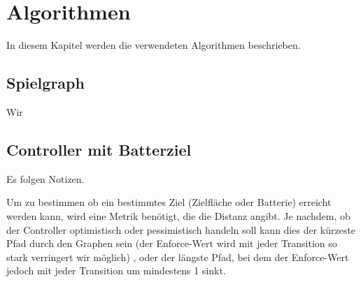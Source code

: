 \section{Algorithmen}
In diesem Kapitel werden die verwendeten Algorithmen beschrieben.
\subsection{Spielgraph}
Wir%

\subsection{Controller mit Batterziel}
Es folgen Notizen.

Um zu bestimmen ob ein bestimmtes Ziel (Zielfläche oder Batterie) erreicht werden kann, wird eine Metrik benötigt,
die die Distanz angibt. Je nachdem, ob der Controller optimistisch oder pessimistisch handeln soll kann dies der kürzeste
Pfad durch den Graphen sein (der Enforce-Wert wird mit jeder Transition so stark verringert wir möglich)
, oder der längste Pfad, bei dem der Enforce-Wert jedoch mit jeder Transition um mindestens 1 sinkt.
